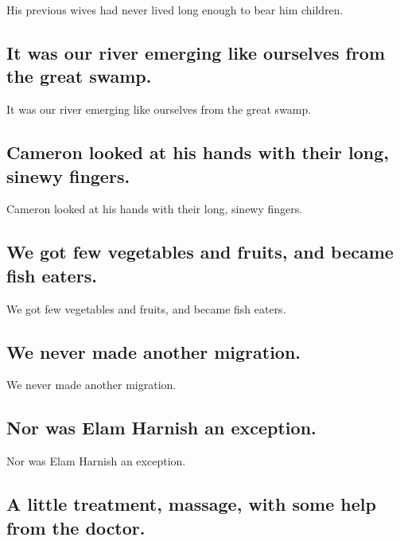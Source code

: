 \documentclass[]{article}
\begin{document}
His previous wives had never lived long enough to bear him children.

\hypertarget{it-was-our-river-emerging-like-ourselves-from-the-great-swamp.}{%
\subsection{It was our river emerging like ourselves from the great
swamp.}\label{it-was-our-river-emerging-like-ourselves-from-the-great-swamp.}}

It was our river emerging like ourselves from the great swamp.

\hypertarget{cameron-looked-at-his-hands-with-their-long-sinewy-fingers.}{%
\subsection{Cameron looked at his hands with their long, sinewy
fingers.}\label{cameron-looked-at-his-hands-with-their-long-sinewy-fingers.}}

Cameron looked at his hands with their long, sinewy fingers.

\hypertarget{we-got-few-vegetables-and-fruits-and-became-fish-eaters.}{%
\subsection{We got few vegetables and fruits, and became fish
eaters.}\label{we-got-few-vegetables-and-fruits-and-became-fish-eaters.}}

We got few vegetables and fruits, and became fish eaters.

\hypertarget{we-never-made-another-migration.}{%
\subsection{We never made another
migration.}\label{we-never-made-another-migration.}}

We never made another migration.

\hypertarget{nor-was-elam-harnish-an-exception.}{%
\subsection{Nor was Elam Harnish an
exception.}\label{nor-was-elam-harnish-an-exception.}}

Nor was Elam Harnish an exception.

\hypertarget{a-little-treatment-massage-with-some-help-from-the-doctor.}{%
\subsection{A little treatment, massage, with some help from the
doctor.}\label{a-little-treatment-massage-with-some-help-from-the-doctor.}}
\end{document}

